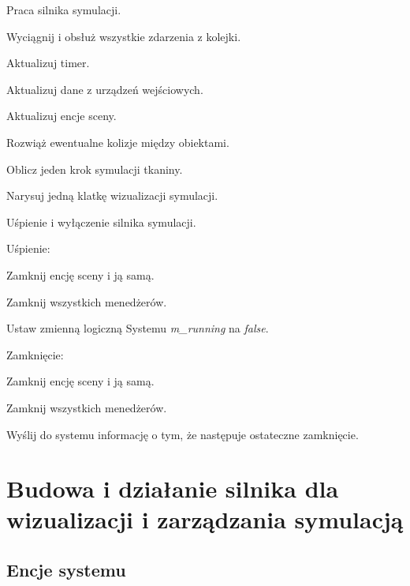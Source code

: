 	\begin{algorithm}
		\label{alg_4_2}
		\caption{Praca silnika symulacji.}	
		
		{
			Wyciągnij i obsłuż wszystkie zdarzenia z kolejki.
			
			{
				Aktualizuj timer.
				
				Aktualizuj dane z urządzeń wejściowych.
				
				Aktualizuj encje sceny.
				
				\Indp
				
				Rozwiąż ewentualne kolizje między obiektami.
				
				Oblicz jeden krok symulacji tkaniny.
				
				\Indm
				
				Narysuj jedną klatkę wizualizacji symulacji.
			}
		}	
	\end{algorithm}
	
	\begin{algorithm}
		\label{alg_4_3}
		\caption{Uśpienie i wyłączenie silnika symulacji.}	
		
		Uśpienie:
		
		\Indp
		
			Zamknij encję sceny i ją samą.
			
			Zamknij wszystkich menedżerów.
			
			Ustaw zmienną logiczną Systemu \emph{m\_running} na \emph{false}.
		
		\Indm
		
		Zamknięcie:
		
		\Indp
		
			Zamknij encję sceny i ją samą.
			
			Zamknij wszystkich menedżerów.
			
			Wyślij do systemu informację o tym, że następuje ostateczne zamknięcie.
		
		\Indm
		
	\end{algorithm}
	\newpage
	
	\section{Budowa i działanie silnika dla wizualizacji i zarządzania symulacją}
	\label{t:praktyka:silnik}
	
	
		\subsection{Encje systemu}
		\label{t:praktyka:silnik:komponent}
		
